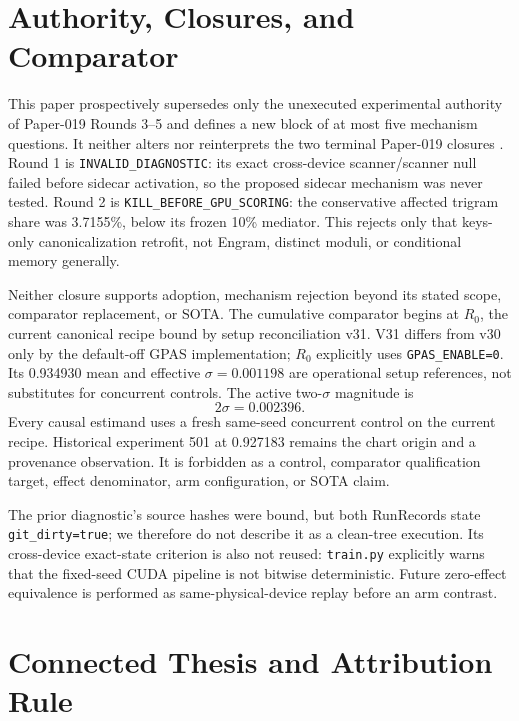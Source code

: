 \documentclass{article}
\begin{document}
\section{Authority, Closures, and Comparator}

This paper prospectively supersedes only the unexecuted experimental authority
of Paper-019 Rounds 3--5 and defines a new block of at most five mechanism
questions.  It neither alters nor reinterprets the two terminal Paper-019
closures \cite{paper019a}.  Round 1 is
\texttt{INVALID\_DIAGNOSTIC}: its exact cross-device scanner/scanner null
failed before sidecar activation, so the proposed sidecar mechanism was never
tested.  Round 2 is \texttt{KILL\_BEFORE\_GPU\_SCORING}: the conservative
affected trigram share was 3.7155\%, below its frozen 10\% mediator.  This
rejects only that keys-only canonicalization retrofit, not Engram, distinct
moduli, or conditional memory generally.

Neither closure supports adoption, mechanism rejection beyond its stated
scope, comparator replacement, or SOTA.  The cumulative comparator begins at
$R_0$, the current canonical recipe bound by setup reconciliation v31.  V31
differs from v30 only by the default-off GPAS implementation; $R_0$ explicitly
uses \texttt{GPAS\_ENABLE=0}.  Its 0.934930 mean and effective
$\sigma=0.001198$ are operational setup
references, not substitutes for concurrent controls.  The active
two-$\sigma$ magnitude is
\[
2\sigma=0.002396.
\]
Every causal estimand uses a fresh same-seed concurrent control on the current
recipe.  Historical experiment 501 at 0.927183 remains the chart origin and a
provenance observation.  It is forbidden as a control, comparator
qualification target, effect denominator, arm configuration, or SOTA claim.

The prior diagnostic's source hashes were bound, but both RunRecords state
\texttt{git\_dirty=true}; we therefore do not describe it as a clean-tree
execution.  Its cross-device exact-state criterion is also not reused:
\texttt{train.py} explicitly warns that the fixed-seed CUDA pipeline is not
bitwise deterministic.  Future zero-effect equivalence is performed as
same-physical-device replay before an arm contrast.

\section{Connected Thesis and Attribution Rule}
\end{document}
